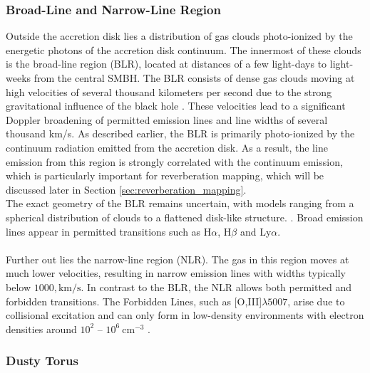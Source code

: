 \subsubsection{Broad-Line and Narrow-Line Region}

Outside the accretion disk lies a distribution of gas clouds photo-ionized by the energetic photons of the accretion disk continuum. The innermost of these clouds is the broad-line region (BLR), located at distances of a few light-days to light-weeks from the central SMBH. The BLR consists of dense gas clouds moving at high velocities of several thousand kilometers per second due to the strong gravitational influence of the black hole \parencite{netzer2013agn}. These velocities lead to a significant Doppler broadening of permitted emission lines and line widths of several thousand km/s. As described earlier, the BLR is primarily photo-ionized by the continuum radiation emitted from the accretion disk. As a result, the line emission from this region is strongly correlated with the continuum emission, which is particularly important for reverberation mapping, which will be discussed later in Section \ref{sec:reverberation_mapping}.\\ The exact geometry of the BLR remains uncertain, with models ranging from a spherical distribution of clouds to a flattened disk-like structure.  \parencite{netzer2013agn}. Broad emission lines appear in permitted transitions such as H$\alpha$, H$\beta$ and Ly$\alpha$. \parencite{peterson1997introduction}
\\\\
Further out lies the narrow-line region (NLR). The gas in this region moves at much lower velocities, resulting in narrow emission lines with widths typically below $1000,\mathrm{km/s}$. In contrast to the BLR, the NLR allows both permitted and forbidden transitions. The Forbidden Lines, such as [O,III]$\lambda5007$, arise due to collisional  excitation and can only form in low-density environments with electron densities around $10^2$ – $10^6 \ \mathrm{cm^{-3}}$ \parencite{osterbrock1989agn}. 





\subsubsection{Dusty Torus}

